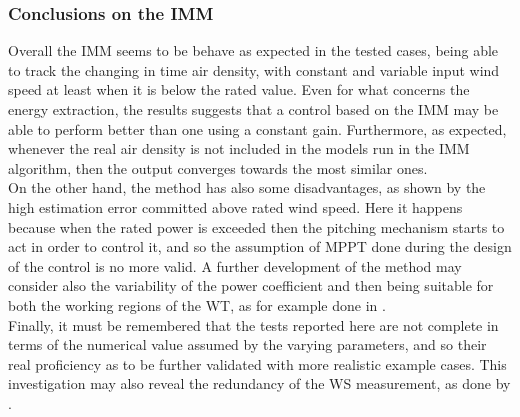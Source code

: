 \subsubsection{Conclusions on the IMM}
Overall the IMM seems to be behave as expected in the tested cases, being able to track the changing in time air density, with constant and variable input wind speed at least when it is below the rated value. Even for what concerns the energy extraction, the results suggests that a control based on the IMM may be able to perform better than one using a constant gain. Furthermore, as expected, whenever the real air density is not included in the models run in the IMM algorithm, then the output converges towards the most similar ones.\\
On the other hand, the method has also some disadvantages, as shown by the high estimation error committed above rated wind speed. Here it happens because when the rated power is exceeded then the pitching mechanism starts to act in order to control it, and so the assumption of MPPT done during the design of the control is no more valid. A further development of the method may consider also the variability of the power coefficient and then being suitable for both the working regions of the WT, as for example done in \cite{kalman_based_IMM}.\\
Finally, it must be remembered that the tests reported here are not complete in terms of the numerical value assumed by the varying parameters, and so their real proficiency as to be further validated with more realistic example cases. This investigation may also reveal the redundancy of the WS measurement, as done by \cite{kalman_based_IMM}.

\newpage